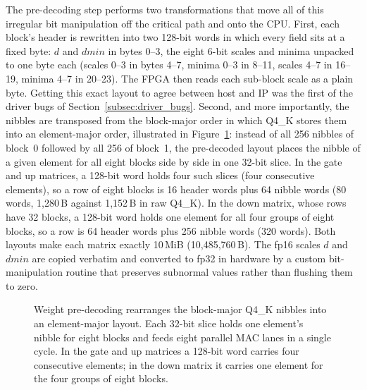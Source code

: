 The pre-decoding step performs two transformations that move all of this irregular bit
manipulation off the critical path and onto the CPU. First, each block's header is
rewritten into two 128-bit words in which every field sits at a fixed byte: $d$ and
$dmin$ in bytes 0--3, the eight 6-bit scales and minima unpacked to one byte each
(scales 0--3 in bytes 4--7, minima 0--3 in 8--11, scales 4--7 in 16--19, minima 4--7 in
20--23). The FPGA then reads each sub-block scale as a plain byte. Getting this exact
layout to agree between host and IP was the first of the driver bugs of
Section~\ref{subsec:driver_bugs}. Second, and more importantly, the nibbles are
transposed from the block-major order in which Q4\_K stores them into an element-major
order, illustrated in Figure~\ref{fig:predecode}: instead of all 256 nibbles of block~0
followed by all 256 of block~1, the pre-decoded layout places the nibble of a given
element for all eight blocks side by side in one 32-bit slice. In the gate and up
matrices, a 128-bit word holds four such slices (four consecutive elements), so a row
of eight blocks is 16 header words plus 64 nibble words (80 words, 1,280\,B against
1,152\,B in raw Q4\_K). In the down matrix, whose rows have 32 blocks, a 128-bit word
holds one element for all four groups of eight blocks, so a row is 64 header words plus
256 nibble words (320 words). Both layouts make each matrix exactly 10\,MiB
(10,485,760\,B). The fp16 scales $d$ and $dmin$ are copied verbatim and converted to fp32
in hardware by a custom bit-manipulation routine that preserves subnormal values rather
than flushing them to zero.

\begin{figure}[htb!]
\centering
{}
\caption{Weight pre-decoding rearranges the block-major Q4\_K nibbles into an
element-major layout. Each 32-bit slice holds one element's nibble for eight blocks and
feeds eight parallel MAC lanes in a single cycle. In the gate and up matrices a 128-bit
word carries four consecutive elements; in the down matrix it carries one element for
the four groups of eight blocks.}
\label{fig:predecode}
\end{figure}

